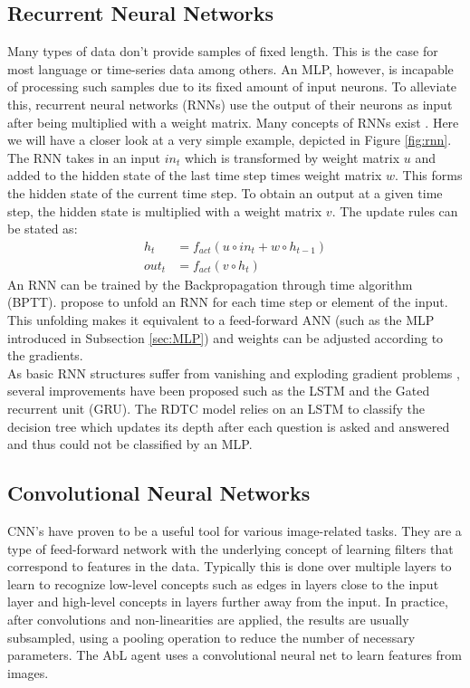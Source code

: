 \documentclass[a4paper,cleardoubleempty,BCOR1cm, 11pt]{report}
\begin{document}
\subsection{Recurrent Neural Networks}
Many types of data don't provide samples of fixed length. This is the case for most language or time-series data among others. An MLP, however, is incapable of processing such samples due to its fixed amount of input neurons. To alleviate this, recurrent neural networks (RNNs) use the output of their neurons as input after being multiplied with a weight matrix. Many concepts of RNNs exist \cite{Grossberg:2013}. Here we will have a closer look at a very simple example, depicted in Figure \ref{fig:rnn}.
The  RNN takes in an input $in_t$ which is transformed by weight matrix $u$ and added to the hidden state of the last time step times weight matrix $w$. This forms the hidden state of the current time step. To obtain an output at a given time step, the hidden state is multiplied with a weight matrix $v$. The update rules can be stated as:
\begin{align}
	h_t &= f_{act}(u \circ in_t + w \circ h_{t-1})\\
	out_t &=f_{act}(v \circ h_t)
\end{align}
An RNN can be trained by the Backpropagation through time algorithm (BPTT). \citet{werbos1990backpropagation} propose to unfold an RNN for each time step or element of the input. This unfolding makes it equivalent to a feed-forward ANN (such as the MLP introduced in Subsection \ref{sec:MLP}) and weights can be adjusted according to the gradients.\\
As basic RNN structures suffer from vanishing and exploding gradient problems \cite{bengio1994learning}, several improvements have been proposed such as the LSTM \cite{hochreiter1997long} and the Gated recurrent unit (GRU)\cite{cho2014learning}.
The RDTC model relies on an LSTM to classify the decision tree which updates its depth after each question is asked and answered and thus could not be classified by an MLP.


\subsection{Convolutional Neural Networks}
CNN's have proven to be a useful tool for various image-related tasks. They are a type of feed-forward network with the underlying concept of learning filters that correspond to features in the data. Typically this is done over multiple layers to learn to recognize low-level concepts such as edges in layers close to the input layer and high-level concepts in layers further away from the input. In practice, after convolutions and non-linearities are applied, the results are usually subsampled, using a pooling operation to reduce the number of necessary parameters. The AbL agent uses a convolutional neural net to learn features from images.
\end{document}
